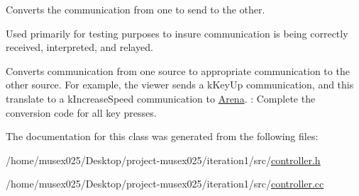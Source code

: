 Converts the communication from one to send to the other. 

Used primarily for testing purposes to insure communication is being correctly received, interpreted, and relayed.

Converts communication from one source to appropriate communication to the other source. For example, the viewer sends a k\+Key\+Up communication, and this translate to a k\+Increase\+Speed communication to \hyperlink{classArena}{Arena}. \+: Complete the conversion code for all key presses. 

The documentation for this class was generated from the following files\+:\begin{DoxyCompactItemize}
\item 
/home/musex025/\+Desktop/project-\/musex025/iteration1/src/\hyperlink{controller_8h}{controller.\+h}\item 
/home/musex025/\+Desktop/project-\/musex025/iteration1/src/\hyperlink{controller_8cc}{controller.\+cc}\end{DoxyCompactItemize}
